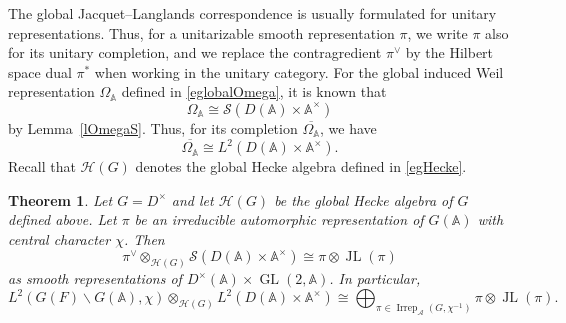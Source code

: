 \documentclass[11pt]{article}
\theoremstyle{plain}
\newtheorem{theorem}{Theorem}[section]
\theoremstyle{remark}
\theoremstyle{definition}
\DeclareMathOperator{\GL}{GL}
\DeclareMathOperator{\JL}{JL}
\DeclareMathOperator{\irr}{Irrep}
\begin{document}
The global Jacquet--Langlands correspondence is usually formulated for unitary representations.
Thus, for a unitarizable smooth representation $\pi$, we write $\pi$ also for its unitary completion, and we replace the contragredient $\pi^{\vee}$ by the Hilbert space dual $\pi^*$ when working in the unitary category.
For the global induced Weil representation $\Omega_{\mathbb{A}}$ defined in \eqref{eglobalOmega}, it is known that
\[
\Omega_{\mathbb{A}}\cong \mathcal{S}(D(\mathbb{A})\times \mathbb{A}^{\times})
\]
by Lemma~\ref{lOmegaS}.
Thus, for its completion $\overline{\Omega_{\mathbb{A}}}$, we have
\[
\overline{\Omega_{\mathbb{A}}}\cong L^2(D(\mathbb{A})\times \mathbb{A}^{\times}).
\]
Recall that $\mathcal{H}(G)$ denotes the global Hecke algebra defined in \eqref{egHecke}.

\begin{theorem}\label{tJltenHecke}
Let $G=D^{\times}$ and let $\mathcal{H}(G)$ be the global Hecke algebra of $G$ defined above.
Let $\pi$ be an irreducible automorphic representation of $G(\mathbb{A})$ with central character $\chi$.
Then
\begin{equation}
   \pi^{\vee}\otimes_{\mathcal{H}(G)}\mathcal{S}(D(\mathbb{A})\times \mathbb{A}^{\times})\cong\pi\otimes\JL(\pi)
\end{equation}
as smooth representations of $D^{\times}(\mathbb{A})\times \GL(2,\mathbb{A})$.
In particular,
\begin{equation}\label{etmain}
    L^2(G(F)\backslash G(\mathbb{A}),\chi)\otimes_{\mathcal{H}(G)}L^2(D(\mathbb{A})\times \mathbb{A}^{\times})
\cong
\bigoplus_{\pi\in\irr_{\mathcal{A}}(G,\chi^{-1})}\pi\otimes\JL(\pi).
\end{equation}
\end{theorem}
\end{document}
